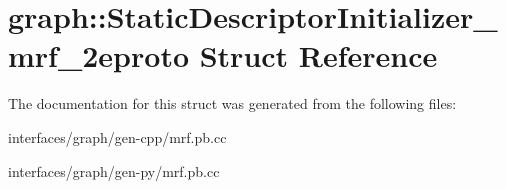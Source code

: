 \hypertarget{structgraph_1_1StaticDescriptorInitializer__mrf__2eproto}{
\section{graph::StaticDescriptorInitializer\_\-mrf\_\-2eproto Struct Reference}
\label{structgraph_1_1StaticDescriptorInitializer__mrf__2eproto}
}


The documentation for this struct was generated from the following files:\begin{DoxyCompactItemize}
\item 
interfaces/graph/gen-\/cpp/mrf.pb.cc\item 
interfaces/graph/gen-\/py/mrf.pb.cc\end{DoxyCompactItemize}
